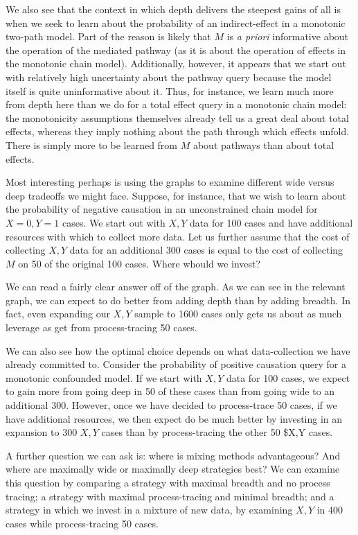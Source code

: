 \documentclass[
  12pt,
]{book}
\begin{document}
We also see that the context in which depth delivers the steepest gains of all is when we seek to learn about the probability of an indirect-effect in a monotonic two-path model. Part of the reason is likely that \(M\) is \emph{a priori} informative about the operation of the mediated pathway (as it is about the operation of effects in the monotonic chain model). Additionally, however, it appears that we start out with relatively high uncertainty about the pathway query because the model itself is quite uninformative about it. Thus, for instance, we learn much more from depth here than we do for a total effect query in a monotonic chain model: the monotonicity assumptions themselves already tell us a great deal about total effects, whereas they imply nothing about the path through which effects unfold. There is simply more to be learned from \(M\) about pathways than about total effects.

Most interesting perhaps is using the graphs to examine different wide versus deep tradeoffs we might face. Suppose, for instance, that we wish to learn about the probability of negative causation in an unconstrained chain model for \(X=0, Y=1\) cases. We start out with \(X,Y\) data for 100 cases and have additional resources with which to collect more data. Let us further assume that the cost of collecting \(X,Y\) data for an additional 300 cases is equal to the cost of collecting \(M\) on 50 of the original 100 cases. Where whould we invest?

We can read a fairly clear answer off of the graph. As we can see in the relevant graph, we can expect to do better from adding depth than by adding breadth. In fact, even expanding our \(X,Y\) sample to 1600 cases only gets us about as much leverage as get from process-tracing 50 cases.

We can also see how the optimal choice depends on what data-collection we have already committed to. Consider the probability of positive causation query for a monotonic confounded model. If we start with \(X,Y\) data for 100 cases, we expect to gain more from going deep in 50 of these cases than from going wide to an additional 300. However, once we have decided to process-trace 50 cases, if we have additional resources, we then expect do be much better by investing in an expansion to 300 \(X,Y\) cases than by process-tracing the other 50 \$X,Y cases.

A further question we can ask is: where is mixing methods advantageous? And where are maximally wide or maximally deep strategies best? We can examine this question by comparing a strategy with maximal breadth and no process tracing; a strategy with maximal process-tracing and minimal breadth; and a strategy in which we invest in a mixture of new data, by examining \(X,Y\) in 400 cases while process-tracing 50 cases.
\end{document}
